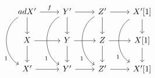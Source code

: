 \documentclass[12pt]{standalone}
\begin{document}
        $$

\begin{tikzcd}
adX^\prime \ar[d] \ar[dd,bend right=60, near end, swap, "1"] \ar[r,"f"] & Y^\prime \ar[r] \ar[d] \ar[dd,bend right=60, near end, swap, "1"] 
& Z^\prime \ar[r] \ar[d] \ar[dd,bend right=60, near end, swap, "1"] & X^\prime[1] \ar[d] \ar[dd,bend right=60, near end, swap, "1"] \\
X \ar[d] \ar[r] & Y \ar[r] \ar[d] & Z \ar[r] \ar[d] & X[1] \ar[d] \\
X^\prime \ar[r] & Y^\prime \ar[r] & Z^\prime \ar[r] & X^\prime[1] 
\end{tikzcd}
        $$
        
\end{document}
